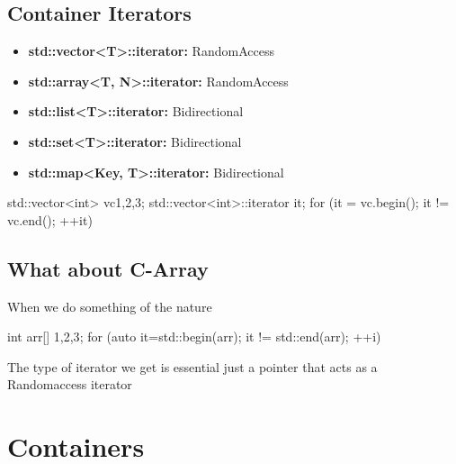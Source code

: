 \documentclass{report}
\begin{document}
    \pagebreak \bigbreak \noindent 
    \subsection{Container Iterators}
    \begin{itemize}
        \item \textbf{std::vector<T>::iterator:} RandomAccess
        \item \textbf{std::array<T, N>::iterator:} RandomAccess
        \item \textbf{std::list<T>::iterator:} Bidirectional  
        \item \textbf{std::set<T>::iterator:} Bidirectional
        \item \textbf{std::map<Key, T>::iterator:} Bidirectional
    \end{itemize}
    \bigbreak \noindent 
    \begin{cppcode}
        std::vector<int> vc{1,2,3};
        std::vector<int>::iterator it;
        for (it = vc.begin(); it != vc.end(); ++it)
    \end{cppcode}


    \bigbreak \noindent 
    \subsection{What about C-Array}
    \bigbreak \noindent 
    When we do something of the nature
    \bigbreak \noindent 
    \begin{cppcode}
        int arr[] {1,2,3};
        for (auto it=std::begin(arr); it != std::end(arr); ++i) { }
    \end{cppcode}
    \bigbreak \noindent 
    The type of iterator we get is essential just a pointer that acts as a Randomaccess iterator

    \pagebreak \bigbreak \noindent 
    \section{\LARGE Containers}
    \bigbreak \noindent 







    



	

	




    
\end{document}
